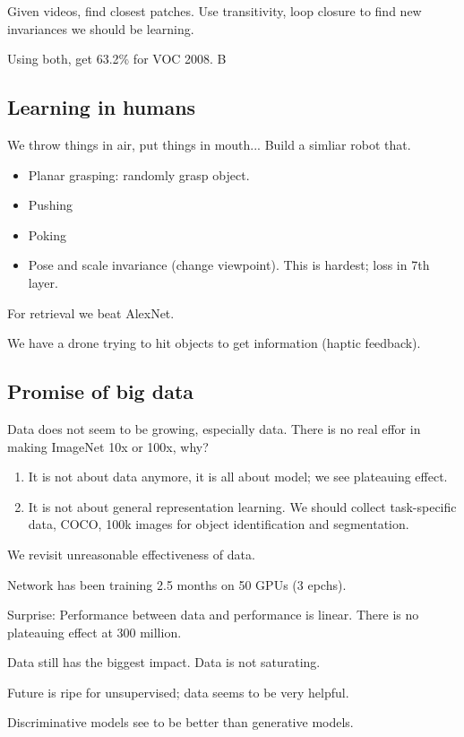Given videos, find closest patches. Use transitivity, loop closure to find new invariances we should be learning.

Using both, get 63.2\% for VOC 2008.
 B
\subsection{Learning in humans}

We throw things in air, put things in mouth... Build a simliar robot that. %
\begin{itemize}
\item
Planar grasping: randomly grasp object.
\item
Pushing
\item
Poking
\item
Pose and scale invariance (change viewpoint). This is hardest; loss in 7th layer.
\end{itemize}

For retrieval we beat AlexNet. 

We have a drone trying to hit objects to get information (haptic feedback).

\subsection{Promise of big data}

Data does not seem to be growing, especially data. There is no real effor in making ImageNet 10x or 100x, why?
\begin{enumerate}
\item
It is not about data anymore, it is all about model; we see plateauing effect.
\item
It is not about general representation learning. We should collect task-specific data, COCO, 100k images for object identification and segmentation.
\end{enumerate}

We revisit unreasonable effectiveness of data.

Network has been training 2.5 months on 50 GPUs (3 epchs).

Surprise:
Performance between data and performance is linear. There is no plateauing effect at 300 million. 

Data still has the biggest impact. Data is not saturating.

Future is ripe for unsupervised; data seems to be very helpful.

Discriminative models see to be better than generative models.
